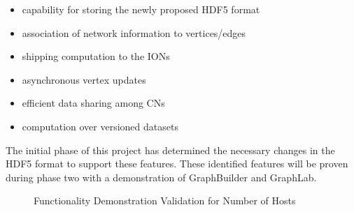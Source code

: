\documentclass[conference]{IEEEtran} \pdfpagewidth=8.5in
\begin{document}
\begin{itemize}
\item
  capability for storing the newly proposed HDF5 format
\item
  association of network information to vertices/edges
\item
  shipping computation to the IONs
\item
  asynchronous vertex updates
\item
  efficient data sharing among CNs
\item
  computation over versioned datasets
\end{itemize}

The initial phase of this project has determined the necessary changes in the
HDF5 format to support these features. These identified features will be
proven during phase two with a demonstration of GraphBuilder and GraphLab.

\begin{figure}[htbp!]
\centering
\caption{Functionality Demonstration Validation for Number of Hosts}
\label{fig:eval-hosts}
\end{figure}
\end{document}
